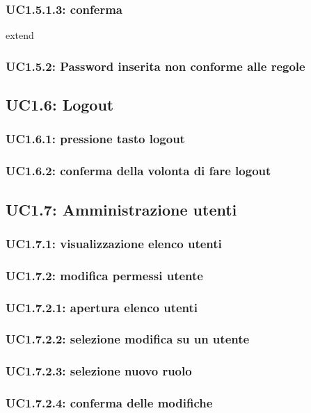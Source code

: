 \subsubsection{UC1.5.1.3: conferma}
extend
\subsubsection{UC1.5.2: Password inserita non conforme alle regole}

\subsection{UC1.6: Logout}
\subsubsection{UC1.6.1: pressione tasto logout}
\subsubsection{UC1.6.2: conferma della volonta di fare logout}

\subsection{UC1.7: Amministrazione utenti}
\subsubsection{UC1.7.1: visualizzazione elenco utenti}
\subsubsection{UC1.7.2: modifica permessi utente}
\subsubsection{UC1.7.2.1: apertura elenco utenti}
\subsubsection{UC1.7.2.2: selezione modifica su un utente}
\subsubsection{UC1.7.2.3: selezione nuovo ruolo}
\subsubsection{UC1.7.2.4: conferma delle modifiche}
